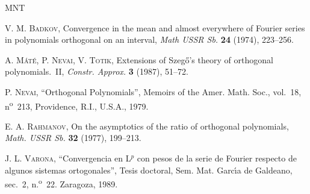 \documentclass[a4paper,12pt]{article}
\theoremstyle{plain}
\theoremstyle{definition}
\begin{document}
\begin{thebibliography}{MNT}

\frenchspacing

\textsc{V. M. Badkov},
Convergence in the mean and almost everywhere of Fourier series
in polynomials orthogonal on an interval,
\textit{Math USSR Sb.} \textbf{24} (1974), 223--256.

\textsc{A. M\'at\'{e}, P. Nevai, V. Totik},
Extensions of Szeg\H{o}'s theory of orthogonal polynomials.~II,
\textit{Constr. Approx.} \textbf{3} (1987), 51--72.

\textsc{P. Nevai},
``Orthogonal Polynomials'',
Memoirs of the Amer. Math. Soc., vol.~18,
n\textsuperscript{o}~213, Providence, R.I., U.S.A., 1979.

\textsc{E. A. Rahmanov},
On the asymptotics of the ratio of orthogonal polynomials,
\textit{Math. USSR Sb.} \textbf{32} (1977), 199--213.

\textsc{J. L. Varona},
``Convergencia en L$^{p}$ con pesos de la serie de Fourier
respecto de algunos sistemas ortogonales'', Tesis doctoral,
Sem. Mat. Garc\'{\i}a de Galdeano, sec.~2,
n.\textsuperscript{o}~22. Zaragoza, 1989.

\end{thebibliography}
\end{document}
